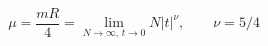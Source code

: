 \begin{equation}
\mu=\frac{mR}{4}=\lim_{N\to\infty,\, t\to 0} N |t|^\nu,\qquad \nu=5/4
\label{scalinglimit}
\end{equation}

